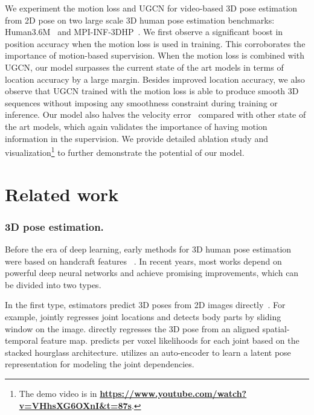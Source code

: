 \documentclass[runningheads]{llncs}
\begin{document}
We experiment the motion loss and UGCN for video-based 3D pose estimation from 2D pose on two large scale 3D human pose estimation benchmarks: Human3.6M~\cite{ionescu2013human3} and MPI-INF-3DHP~\cite{mehta2017mpidata}.
We first observe a significant boost in position accuracy when the motion loss is used in training.
This corroborates the importance of motion-based supervision.
When the motion loss is combined with UGCN, our model surpasses the current state of the art models in terms of location accuracy by a large margin.
Besides improved location accuracy, we also observe that UGCN trained with the motion loss is able to produce smooth 3D sequences without imposing any smoothness constraint during training or inference.
Our model also halves the velocity error~\cite{pavllo20193d} compared with other state of the art models, which again validates the importance of having motion information in the supervision.
We provide detailed ablation study and visualization\footnote[1]{The demo video is in \href{https://www.youtube.com/watch?v=VHhsXG6OXnI&t=87s}{\textbf{\url{https://www.youtube.com/watch?v=VHhsXG6OXnI&t=87s}}}.} to further demonstrate the potential of our model.




\section{Related work}
\subsubsection{3D pose estimation.}

Before the era of deep learning,
early methods for 3D human pose estimation were based on handcraft features
~\cite{ramakrishna2012reconstructing,ionescu2013human3,ionescu2014iterated}.
In recent years, most works depend on powerful deep neural networks and achieve promising improvements,
which can be divided into two types.

In the first type, estimators
predict 3D poses from 2D images directly~\cite{li20143d,tekin2016direct,pavlakos2017coarse,tekin2016structured}.
For example,
\cite{li20143d} jointly regresses joint locations and detects body parts by sliding window on the image.
\cite{tekin2016direct} directly regresses the 3D pose from an aligned spatial-temporal feature map.
\cite{pavlakos2017coarse} predicts per voxel likelihoods for each joint based on the
stacked hourglass architecture.
\cite{tekin2016structured} utilizes an auto-encoder to learn a latent pose representation for modeling the joint dependencies.
\end{document}
